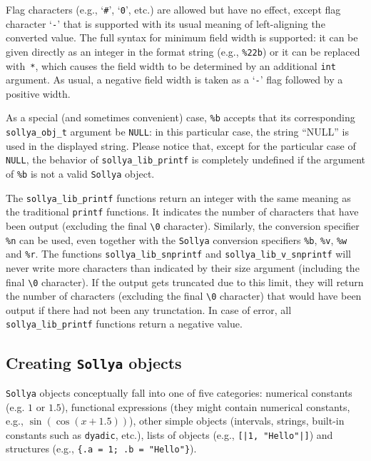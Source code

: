 \documentclass[a4paper]{article}
\newcommand{\sollya}{\texttt{Sollya}\xspace}
\begin{document}
Flag characters (e.g., `\verb|#|', `\verb|0|', etc.) are allowed but have no effect, except flag character `\verb|-|' that is supported with its usual meaning of left-aligning the converted value. The full syntax for minimum field width is supported: it can be given directly as an integer in the format string (e.g., \verb|%22b|) or it can be replaced with~\verb|*|, which causes the field width to be determined by an additional \verb|int| argument. As usual, a negative field width is taken as a `\verb|-|' flag followed by a positive width.

As a special (and sometimes convenient) case, \verb|%b| accepts that its corresponding \verb|sollya_obj_t| argument be \verb|NULL|: in this particular case, the string ``NULL'' is used in the displayed string. Please notice that, except for the particular case of \verb|NULL|, the behavior of \verb|sollya_lib_printf| is completely undefined if the argument of \verb|%b| is not a valid \sollya object.

The \verb|sollya_lib_printf| functions return an integer with the same meaning as the traditional \verb|printf| functions. It indicates the number of characters that have been output (excluding the final \verb|\0| character). Similarly, the conversion specifier \verb|%n| can be used, even together with the \sollya conversion specifiers \verb|%b|, \verb|%v|, \verb|%w| and \verb|%r|. The functions \verb|sollya_lib_snprintf| and \verb|sollya_lib_v_snprintf| will
never write more characters than indicated by their size argument (including the final \verb|\0| character). If the output gets truncated due to this limit, they will return the number of characters (excluding the final \verb|\0| character) that would have been output if there had not been any trunctation. In case of error, all \verb|sollya_lib_printf| functions return a negative value.

\subsection{Creating \sollya objects}
\sollya objects conceptually fall into one of five categories: numerical constants (e.g. $1$ or $1.5$), functional expressions (they might contain numerical constants, e.g., $\sin(\cos(x+1.5))$), other simple objects (intervals, strings, built-in constants such as \texttt{dyadic}, etc.), lists of objects (e.g., \texttt{[|1, "Hello"|]}) and structures (e.g., \verb|{.a = 1; .b = "Hello"}|).
\end{document}
